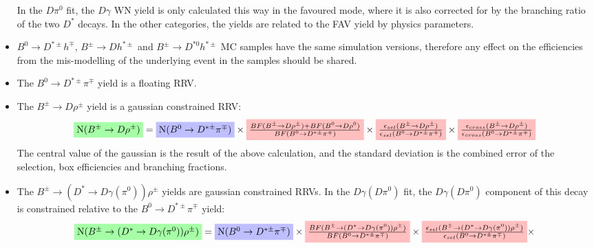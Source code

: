 \documentclass[12pt, landscape]{article}
\begin{document}
\begin{itemize}
  In the $D\pi^0$ fit, the $D\gamma$ WN yield is only calculated this way in the
  favoured mode, where it is also corrected for by the branching ratio of the
  two $D^*$ decays. In the other categories, the yields are related to the FAV
  yield by physics parameters.  \item $B^0\rightarrow D^{*\pm}h^{\mp}$,
  $B^{\pm}\rightarrow Dh^{*\pm}$ and $B^{\pm}\rightarrow D^{*0}h^{*\pm}$ MC
  samples have the same simulation versions, therefore any effect on the
  efficiencies from the mis-modelling of the underlying event in the samples
  should be shared.
  \item The $B^0\rightarrow D^{*\pm}\pi^{\mp}$ yield is a floating RRV.
  \item The $B^{\pm}\rightarrow D\rho^{\pm}$ yield is a gaussian constrained RRV:
    \begin{equation*}
      \colorbox{green!35}{\text{N($B^{\pm}\rightarrow D\rho^{\pm}$)}} =
      \colorbox{blue!25}{\text{N($B^0\rightarrow D^{*\pm}\pi^{\mp}$)}} \times 
      \colorbox{pink}{$\frac{BF(B^{\pm}\rightarrow D\rho^{\pm}) +
      BF(B^0\rightarrow D\rho^0)}{BF(B^0\rightarrow D^{*\pm}\pi^{\mp})}$} \times
      \colorbox{pink}{$\frac{\epsilon_{sel}(B^{\pm}\rightarrow
      D\rho^{\pm})}{\epsilon_{sel}(B^0\rightarrow D^{*\pm}\pi^{\mp})}$} \times
      \colorbox{pink}{$\frac{\epsilon_{cross}(B^{\pm}\rightarrow
      D\rho^{\pm})}{\epsilon_{cross}(B^0\rightarrow D^{*\pm}\pi^{\mp})}$}
  \end{equation*}
    The central value of the gaussian is the result of the above calculation,
    and the standard deviation is the combined error of the selection, box
    efficiencies and branching fractions.
  \item The $B^{\pm}\rightarrow (D^*\rightarrow D\gamma(\pi^0))\rho^{\pm}$
    yields are gaussian constrained RRVs. In the $D\gamma(D\pi^0)$ fit, the
    $D\gamma(D\pi^0)$ component of this decay is constrained relative to the
    $B^0\rightarrow D^{*\pm}\pi^{\mp}$ yield:
    \begin{equation*}
      \colorbox{green!35}{\text{N($B^{\pm}\rightarrow (D^*\rightarrow
      D\gamma(\pi^0))\rho^{\pm}$)}} =
      \colorbox{blue!25}{\text{N($B^0\rightarrow D^{*\pm}\pi^{\mp}$)}} \times 
      \colorbox{pink}{$\frac{BF(B^{\pm}\rightarrow (D^*\rightarrow
      D\gamma(\pi^0))\rho^{\pm})}{BF(B^0\rightarrow D^{*\pm}\pi^{\mp})}$} \times
      \colorbox{pink}{$\frac{\epsilon_{sel}(B^{\pm}\rightarrow (D^*\rightarrow
      D\gamma(\pi^0))\rho^{\pm})}{\epsilon_{sel}(B^0\rightarrow
    D^{*\pm}\pi^{\mp})}$} \times

\end{equation*}
\end{itemize}
\end{document}
